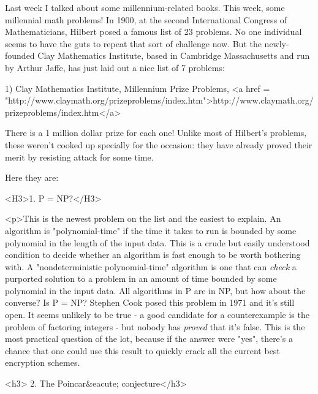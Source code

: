 

 

Last week I talked about some millennium-related books.  This week, some
millennial math problems!  In 1900, at the second International Congress
of Mathematicians, Hilbert posed a famous list of 23 problems.  No one
individual seems to have the guts to repeat that sort of challenge now. 
But the newly-founded Clay Mathematics Institute, based in Cambridge
Massachusetts and run by Arthur Jaffe, has just laid out a nice list of
7 problems:

1) Clay Mathematics Institute, Millennium Prize Problems, 
<a href = "http://www.claymath.org/prizeproblems/index.htm">http://www.claymath.org/prizeproblems/index.htm</a>

There is a 1 million dollar prize for each one!  Unlike most of Hilbert's 
problems, these weren't cooked up specially for the occasion: they have 
already proved their merit by resisting attack for some time.  

Here they are:

<H3>1. P = NP?</H3>

<p>This is the newest problem on the list and the easiest
to explain. An algorithm is "polynomial-time" 
if the time it takes to run
is bounded by some polynomial in the length of the input data. This is
a crude but easily understood condition to decide whether an algorithm
is fast enough to be worth bothering with. A 
"nondeterministic polynomial-time"
algorithm is one that can \emph{check} a purported solution to a problem in
an amount of time bounded by some polynomial in the input data. All algorithms
in P are in NP, but how about the converse? Is P = NP? Stephen Cook posed
this problem in 1971 and it's still open. It seems unlikely to be true
- a good candidate for a counterexample is the problem of factoring integers
- but nobody has \emph{proved} that it's false. This is the most practical 
question
of the lot, because if the answer were "yes", 
there's a chance that one could use this result to quickly crack 
all the current best encryption schemes.

<h3> 2. The Poincar&eacute; conjecture</h3>

